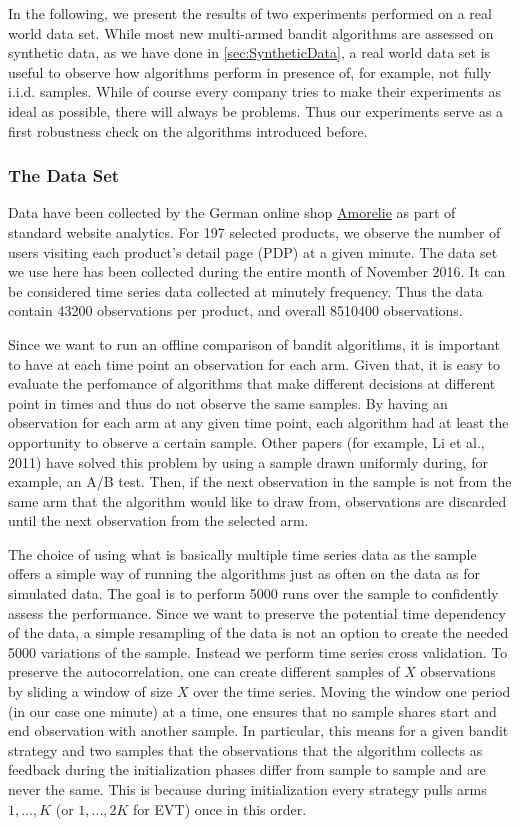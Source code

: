 \documentclass[11pt,]{article}
\begin{document}
In the following, we present the results of two experiments performed on
a real world data set. While most new multi-armed bandit algorithms are
assessed on synthetic data, as we have done in
\autoref{sec:SyntheticData}, a real world data set is useful to observe
how algorithms perform in presence of, for example, not fully i.i.d.
samples. While of course every company tries to make their experiments
as ideal as possible, there will always be problems. Thus our
experiments serve as a first robustness check on the algorithms
introduced before.

\subsubsection{The Data Set}\label{the-data-set}

Data have been collected by the German online shop
\href{https://amorelie.de}{Amorelie} as part of standard website
analytics. For 197 selected products, we observe the number of users
visiting each product's detail page (PDP) at a given minute. The data
set we use here has been collected during the entire month of November
2016. It can be considered time series data collected at minutely
frequency. Thus the data contain 43200 observations per product, and
overall 8510400 observations.

Since we want to run an offline comparison of bandit algorithms, it is
important to have at each time point an observation for each arm. Given
that, it is easy to evaluate the perfomance of algorithms that make
different decisions at different point in times and thus do not observe
the same samples. By having an observation for each arm at any given
time point, each algorithm had at least the opportunity to observe a
certain sample. Other papers (for example, Li et al., 2011) have solved
this problem by using a sample drawn uniformly during, for example, an
A/B test. Then, if the next observation in the sample is not from the
same arm that the algorithm would like to draw from, observations are
discarded until the next observation from the selected arm.

The choice of using what is basically multiple time series data as the
sample offers a simple way of running the algorithms just as often on
the data as for simulated data. The goal is to perform 5000 runs over
the sample to confidently assess the performance. Since we want to
preserve the potential time dependency of the data, a simple resampling
of the data is not an option to create the needed 5000 variations of the
sample. Instead we perform time series cross validation. To preserve the
autocorrelation, one can create different samples of \(X\) observations
by sliding a window of size \(X\) over the time series. Moving the
window one period (in our case one minute) at a time, one ensures that
no sample shares start and end observation with another sample. In
particular, this means for a given bandit strategy and two samples that
the observations that the algorithm collects as feedback during the
initialization phases differ from sample to sample and are never the
same. This is because during initialization every strategy pulls arms
\(1, ..., K\) (or \(1,...,2K\) for EVT) once in this order.
\end{document}
